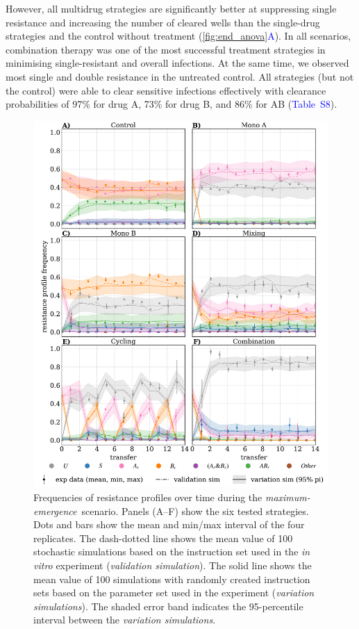 \documentclass[9pt,twocolumn,twoside,lineno]{pnas-new}
\newcommand{\sitab}[1]{\textcolor{blue}{Table~S#1}}
\newcommand{\panelref}[2]{\autoref{#1}\textcolor{blue}{#2}}
\begin{document}
    However, all multidrug strategies are significantly better at suppressing single resistance and increasing the number of cleared wells than the single-drug strategies and the control without treatment (\panelref{fig:end_anova}{A}). 
    In all scenarios, combination therapy was one of the most successful treatment strategies in minimising single-resistant and overall infections. 
    At the same time, we observed most single and double resistance in the untreated control.
    All strategies (but not the control) were able to clear sensitive infections effectively with clearance probabilities of 97\% for drug A, 73\% for drug B, and 86\% for AB (\sitab{8}).
    
    
    \begin{figure}
         \centering
         \includegraphics[width=\linewidth]{scen3_paper.pdf}
         \captionsetup{skip=2pt}
         \caption{
         Frequencies of resistance profiles over time during the \textit{maximum-emergence}~scenario. Panels (A--F) show the six tested strategies.
         Dots and bars show the mean and min/max interval of the four replicates.
         The dash-dotted line shows the mean value of 100 stochastic simulations based on the instruction set used in the \textit{in vitro} experiment (\textit{validation simulation}). 
         The solid line shows the mean value of 100 simulations with randomly created instruction sets based on the parameter set used in the experiment (\textit{variation simulations}). 
         The shaded error band indicates the 95-percentile interval between the \textit{variation simulations}.}
         \label{fig:exp3} 
    \end{figure}
    
\end{document}
